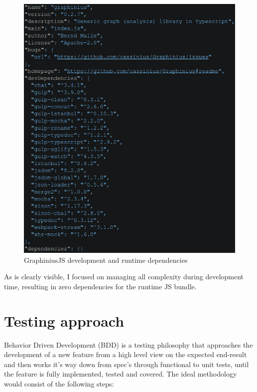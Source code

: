 	\begin{figure}[H]
		\centering
		\hspace*{-0.5cm}
		\includegraphics[width=1\textwidth]{figures/package_deps}
		\caption{GraphiniusJS development and runtime dependencies}
		\label{fig:dependencies}
	\end{figure}
	\small
	As is clearly visible, I focused on managing all complexity during development time, resulting in zero dependencies for the runtime JS bundle.


\section{Testing approach}
\label{sect:testing_approach}

	Behavior Driven Development (BDD) is a testing philosophy that approaches the development of a new feature from a high level view on the expected end-result and then works it's way down from spec's through functional to unit tests, until the feature is fully implemented, tested and covered. The ideal methodology would consist of the following steps:
	
